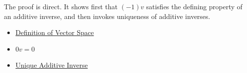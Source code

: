 \begin{remark*}
The proof is direct. It shows first that $(-1)v$ satisfies the defining property of an additive inverse, and then invokes uniqueness of additive inverses.
\end{remark*}

\begin{remark*}[Dependencies]
\hfill
\begin{itemize}
  \item \hyperref[def:vector-space]{Definition of Vector Space}
  \item \hyperref[thm:zero-scalar-times-vector]{$0v=0$}
  \item \hyperref[thm:unique-additive-inverse]{Unique Additive Inverse}
\end{itemize}
\end{remark*}